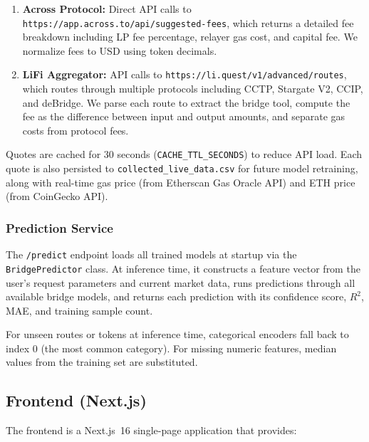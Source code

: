 \begin{enumerate}
    \item \textbf{Across Protocol:} Direct API calls to \texttt{https://app.across.to/api/suggested-fees}, which returns a detailed fee breakdown including LP fee percentage, relayer gas cost, and capital fee. We normalize fees to USD using token decimals.

    \item \textbf{LiFi Aggregator:} API calls to \texttt{https://li.quest/v1/advanced/routes}, which routes through multiple protocols including CCTP, Stargate V2, CCIP, and deBridge. We parse each route to extract the bridge tool, compute the fee as the difference between input and output amounts, and separate gas costs from protocol fees.
\end{enumerate}

Quotes are cached for 30 seconds (\texttt{CACHE\_TTL\_SECONDS}) to reduce API load. Each quote is also persisted to \texttt{collected\_live\_data.csv} for future model retraining, along with real-time gas price (from Etherscan Gas Oracle API) and ETH price (from CoinGecko API).

\subsubsection{Prediction Service}

The \texttt{/predict} endpoint loads all trained models at startup via the \texttt{BridgePredictor} class. At inference time, it constructs a feature vector from the user's request parameters and current market data, runs predictions through all available bridge models, and returns each prediction with its confidence score, $R^2$, MAE, and training sample count.

For unseen routes or tokens at inference time, categorical encoders fall back to index 0 (the most common category). For missing numeric features, median values from the training set are substituted.

\subsection{Frontend (Next.js)}

The frontend is a Next.js~16 single-page application that provides:

